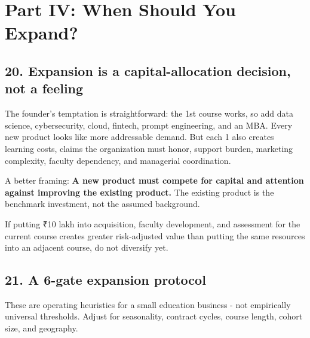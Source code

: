 
\section*{Part IV: When Should You Expand?}

\subsection{20. Expansion is a capital-allocation decision, not a feeling}

The founder's temptation is straightforward: the 1st course works, so add data science, cybersecurity, cloud, fintech, prompt engineering, and an MBA. Every new product looks like more addressable demand. But each 1 also creates learning costs, claims the organization must honor, support burden, marketing complexity, faculty dependency, and managerial coordination.

A better framing: \textbf{A new product must compete for capital and attention against improving the existing product.} The existing product is the benchmark investment, not the assumed background.

If putting \textnormal{₹}10 lakh into acquisition, faculty development, and assessment for the current course creates greater risk-adjusted value than putting the same resources into an adjacent course, do not diversify yet.

\subsection{21. A 6-gate expansion protocol}

These are operating heuristics for a small education business - not empirically universal thresholds. Adjust for seasonality, contract cycles, course length, cohort size, and geography.

